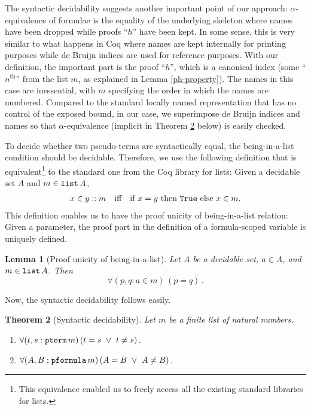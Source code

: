 \documentclass{svjour3}                     %
\newtheorem{thm}{Theorem}%
\newtheorem{lem}[thm]{Lemma}
\newcommand{\al}{\alpha}
\newcommand{\tpterm}{\textup{\tt pterm}}
\newcommand{\tpfml}{\textup{\tt pformula}}
\newcommand{\tlist}{\textup{\tt list}}
\newcommand{\tTrue}{\textup{\tt True}}
\begin{document}
The syntactic decidability suggests another important point of our approach: $\al$-equivalence of formulae is the equality of the underlying skeleton where names have been dropped while proofs ``$h$'' have been kept.
In some sense, this is very similar to what happens in Coq where names are kept internally for printing purposes while de Bruijn indices are used for reference purposes. With our definition, the important part is the proof ``$h$'', which is a canonical index (some ``$n^{\text{th}}$'' from the list $m$, as explained in Lemma \ref{ph-property}). The names in this case are inessential, with $m$ specifying the order in which the names are numbered. Compared to the standard locally named representation that has no control of the exposed bound, in our case, we superimpose de Bruijn indices and names so that $\al$-equivalence (implicit in Theorem \ref{syn-dec} below) is easily checked.

To decide whether two pseudo-terms are syntactically equal, the being-in-a-list condition should be decidable. Therefore, we use the following definition that is equivalent\footnote{This equivalence enabled us to freely access all the existing standard libraries for lists.} to  the standard one from the Coq library for lists: Given a decidable set $A$ and $m \in \tlist \, A$,
\begin{eqnarray*}
x \in y :: m \quad \text{iff}\quad  \text{if $x=y$ then $\tTrue$ else $x \in m$.}
\end{eqnarray*}
This definition enables us to have the proof unicity of being-in-a-list relation: Given a parameter, the proof part in the definition of a formula-scoped variable is uniquely defined.

\begin{lem}[Proof unicity of being-in-a-list]\label{proof-uniqueness}
Let $A$ be a decidable set, $a \in A$, and {\em $m \in  \tlist\, A$}. Then
\[
\forall (p, q: a\in m)\, (p = q)\, .
\]
\end{lem}


Now, the syntactic decidability follows easily.
\begin{thm}[Syntactic decidability]\label{syn-dec} 
  Let $m$ be a finite list of natural numbers.
\begin{enumerate}
\item $\forall (t, s: \tpterm\, m)\, (t=s \,\,\lor\,\, t \neq s)$.

\item $\forall (A, B: \tpfml\, m)\, (A = B \,\,\lor\,\, A \neq B)$.
\end{enumerate}
\end{thm}
\end{document}
